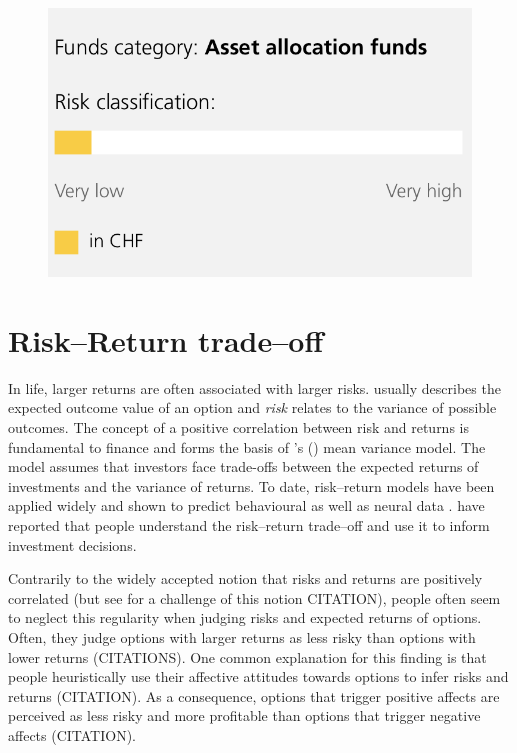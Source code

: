 \documentclass[a4paper,doc, natbib]{apa6} %
\begin{document}
\begin{figure}[!htbp] 
  \centering
 \includegraphics[width=.4\linewidth, keepaspectratio]{pf_risk1.png} 
  \caption{}
  \label{fig:pfrisk}
\end{figure}

\section{Risk--Return trade--off}
In life, larger returns are often associated with larger risks.  usually describes the expected outcome value of an option and \textit{risk} relates to the variance of possible outcomes. The concept of a positive correlation between risk and returns is fundamental to finance and forms the basis of \citeauthor{Markowitz1952}'s (\citeyear{Markowitz1952}) mean variance model. The model assumes that investors face trade-offs between the expected returns of investments and the variance of returns. To date, risk--return models have been applied widely \citep[e.g.,][]{Weber2008, Mohr2010a} and shown to predict behavioural as well as neural data \citep{Mohr2010a}. \cite{Sunden1998} have reported that people understand the risk--return trade--off and use it to inform investment decisions.


Contrarily to the widely accepted notion that risks and returns are positively correlated (but see for a challenge of this notion CITATION), people often seem to neglect this regularity when judging risks and expected returns of options. Often, they judge options with larger returns as less risky than options with lower returns (CITATIONS). One common explanation for this finding is that people heuristically use their affective attitudes towards options to infer risks and returns (CITATION). As a consequence, options that trigger positive affects are perceived as less risky and more profitable than options that trigger negative affects (CITATION). 
\end{document}
